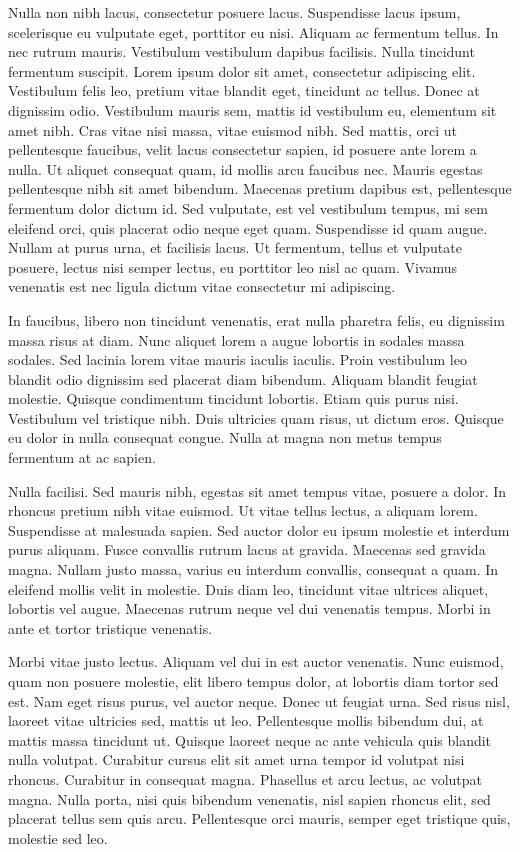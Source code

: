 Nulla non nibh lacus, consectetur posuere lacus. Suspendisse lacus
ipsum, scelerisque eu vulputate eget, porttitor eu nisi. Aliquam ac
fermentum tellus. In nec rutrum mauris. Vestibulum vestibulum dapibus
facilisis. Nulla tincidunt fermentum suscipit. Lorem ipsum dolor sit
amet, consectetur adipiscing elit. Vestibulum felis leo, pretium vitae
blandit eget, tincidunt ac tellus. Donec at dignissim odio. Vestibulum
mauris sem, mattis id vestibulum eu, elementum sit amet nibh. Cras
vitae nisi massa, vitae euismod nibh. Sed mattis, orci ut pellentesque
faucibus, velit lacus consectetur sapien, id posuere ante lorem a
nulla. Ut aliquet consequat quam, id mollis arcu faucibus nec. Mauris
egestas pellentesque nibh sit amet bibendum. Maecenas pretium dapibus
est, pellentesque fermentum dolor dictum id. Sed vulputate, est vel
vestibulum tempus, mi sem eleifend orci, quis placerat odio neque eget
quam. Suspendisse id quam augue. Nullam at purus urna, et facilisis
lacus. Ut fermentum, tellus et vulputate posuere, lectus nisi semper
lectus, eu porttitor leo nisl ac quam. Vivamus venenatis est nec
ligula dictum vitae consectetur mi adipiscing.

In faucibus, libero non tincidunt venenatis, erat nulla pharetra
felis, eu dignissim massa risus at diam. Nunc aliquet lorem a augue
lobortis in sodales massa sodales. Sed lacinia lorem vitae mauris
iaculis iaculis. Proin vestibulum leo blandit odio dignissim sed
placerat diam bibendum. Aliquam blandit feugiat molestie. Quisque
condimentum tincidunt lobortis. Etiam quis purus nisi. Vestibulum vel
tristique nibh. Duis ultricies quam risus, ut dictum eros. Quisque eu
dolor in nulla consequat congue. Nulla at magna non metus tempus
fermentum at ac sapien.

Nulla facilisi. Sed mauris nibh, egestas sit amet tempus vitae,
posuere a dolor. In rhoncus pretium nibh vitae euismod. Ut vitae
tellus lectus, a aliquam lorem. Suspendisse at malesuada sapien. Sed
auctor dolor eu ipsum molestie et interdum purus aliquam. Fusce
convallis rutrum lacus at gravida. Maecenas sed gravida magna. Nullam
justo massa, varius eu interdum convallis, consequat a quam. In
eleifend mollis velit in molestie. Duis diam leo, tincidunt vitae
ultrices aliquet, lobortis vel augue. Maecenas rutrum neque vel dui
venenatis tempus. Morbi in ante et tortor tristique venenatis.

Morbi vitae justo lectus. Aliquam vel dui in est auctor
venenatis. Nunc euismod, quam non posuere molestie, elit libero tempus
dolor, at lobortis diam tortor sed est. Nam eget risus purus, vel
auctor neque. Donec ut feugiat urna. Sed risus nisl, laoreet vitae
ultricies sed, mattis ut leo. Pellentesque mollis bibendum dui, at
mattis massa tincidunt ut. Quisque laoreet neque ac ante vehicula quis
blandit nulla volutpat. Curabitur cursus elit sit amet urna tempor id
volutpat nisi rhoncus. Curabitur in consequat magna. Phasellus et arcu
lectus, ac volutpat magna. Nulla porta, nisi quis bibendum venenatis,
nisl sapien rhoncus elit, sed placerat tellus sem quis
arcu. Pellentesque orci mauris, semper eget tristique quis, molestie
sed leo.

